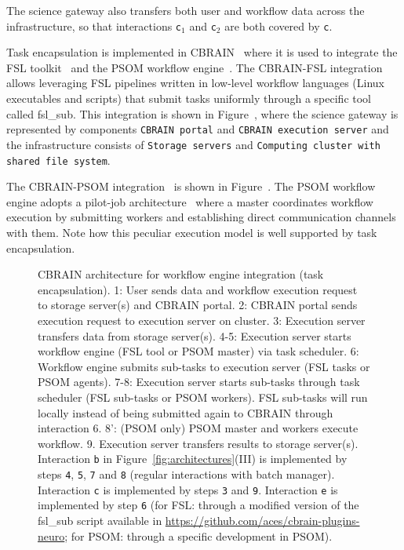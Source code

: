 \documentclass[preprint,3p,twocolumn]{elsarticle}
\begin{document}
The science gateway also transfers both user and workflow data across
the infrastructure, so that interactions \texttt{c$_1$} and
\texttt{c$_2$} are both covered by \texttt{c}. 

Task encapsulation is implemented in CBRAIN~\cite{SHER-14} where it is
used to integrate the FSL toolkit~\cite{Jenkinson2012782} and the PSOM
workflow engine~\cite{bellec2012pipeline}. The CBRAIN-FSL integration
allows leveraging FSL pipelines written in low-level workflow
languages (Linux executables and scripts) that submit tasks uniformly
through a specific tool called fsl\_sub. This integration is shown in
Figure~, where the science gateway is
represented by components \texttt{CBRAIN portal} and \texttt{CBRAIN
  execution server} and the infrastructure consists of \texttt{Storage
  servers} and \texttt{Computing cluster with shared file system}.

The CBRAIN-PSOM integration~\cite{GLAT-16} is shown in
Figure~. The PSOM workflow engine
adopts a pilot-job architecture~\cite{turilli2015comprehensive} where
a master coordinates workflow execution by submitting workers and
establishing direct communication channels with them. Note how this
peculiar execution model is well supported by task encapsulation.

\begin{figure}
\centering
{} \hfill {}
\caption{CBRAIN architecture for workflow engine integration
  (task encapsulation).  1: User sends data and workflow execution request to
  storage server(s) and CBRAIN portal. 2: CBRAIN portal sends
  execution request to execution server on cluster. 3: Execution
  server transfers data from storage server(s). 4-5: Execution server
  starts workflow engine (FSL tool or PSOM master) via task
  scheduler. 6: Workflow engine submits sub-tasks to execution server
  (FSL tasks or PSOM agents). 7-8: Execution server starts sub-tasks
  through task scheduler (FSL sub-tasks or PSOM workers). FSL sub-tasks will run locally
  instead of being submitted again to CBRAIN through interaction 6. 8':
  (PSOM only) PSOM master and workers execute workflow. 9. Execution
  server transfers results to storage server(s). Interaction
  \texttt{b} in Figure~\ref{fig:architectures}(III) is implemented by steps
  \texttt{4}, \texttt{5}, \texttt{7} and \texttt{8} (regular
  interactions with batch manager). Interaction \texttt{c} is
  implemented by steps \texttt{3} and \texttt{9}. Interaction
  \texttt{e} is implemented by step \texttt{6} (for FSL: through a
  modified version of the fsl\_sub script available in
  \url{https://github.com/aces/cbrain-plugins-neuro}; for PSOM:
  through a specific development in PSOM).}
\label{fig:cbrain-sub-tasking}
\end{figure}
\end{document}
